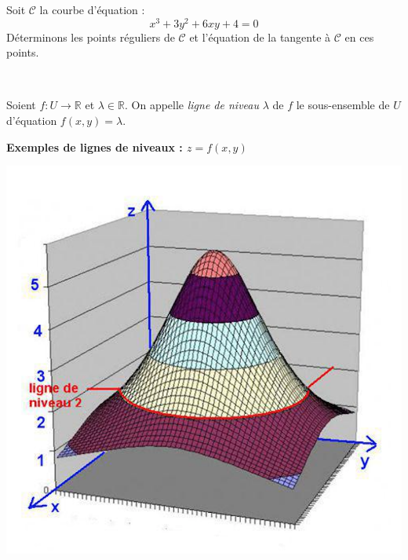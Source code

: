 \documentclass[french,11pt,twoside]{VcCours}
\begin{document}
%
%
%
%
%

\begin{Exemple}{} Soit $\mathcal{C}$ la courbe d'équation :
$$ x^3+3y^2+6xy+4=0$$
Déterminons les points réguliers de $\mathcal{C}$ et l'équation de la tangente à $\mathcal{C}$ en ces points.

\newpage

$\phantom{}$
\vspace*{8cm}
\end{Exemple}

\begin{Definition}{} Soient $f : U \rightarrow \mathbb{R}$ et $\lambda \in \mathbb{R}$. On appelle \emph{ligne de niveau} $\lambda$ de $f$ le sous-ensemble de $U$ d'équation $f(x,y)=\lambda$.
\end{Definition}

\begin{center}
\textbf{Exemples de lignes de niveaux : $z=f(x,y)$}
\end{center}

\begin{center}
\includegraphics[scale=0.5]{niv}
\end{center}
\end{document}
